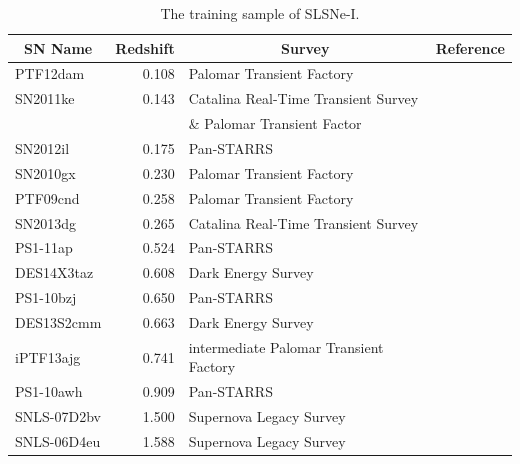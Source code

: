 \begin{table}
\begin{center}
  \caption{The training sample of SLSNe-I.}
\label{tab:PubishedSLSNe}
\begin{tabular}{|l|r|l|l|}
\hline
  \multicolumn{1}{|c|}{SN Name} &
  \multicolumn{1}{c|}{Redshift} &
  \multicolumn{1}{c|}{Survey} &
  \multicolumn{1}{c|}{Reference} \\
\hline
  PTF12dam         & 0.108 & Palomar Transient Factory             & \citet{Nicholl2013}\\
  SN2011ke         & 0.143 & Catalina Real-Time Transient Survey     & \citet{Inserra2013}\\
                      &       & \& Palomar Transient Factor & \\
  SN2012il         & 0.175 & Pan-STARRS                             & \citet{Lunnan2013}\\
  SN2010gx         & 0.230 & Palomar Transient Factory             & \citet{Pastorello2010}\\
  PTF09cnd         & 0.258 & Palomar Transient Factory             & \citet{Quimby2011}\\
  SN2013dg         & 0.265 & Catalina Real-Time Transient Survey     & \citet{Nicholl2014} \\
  PS1-11ap         & 0.524 & Pan-STARRS                             & \citet{McCrum2014a}\\
  DES14X3taz     & 0.608 & Dark Energy Survey                     & \citet{Smith2016} \\
  PS1-10bzj     & 0.650 & Pan-STARRS                             & \citet{Lunnan2013}\\
  DES13S2cmm     & 0.663 & Dark Energy Survey                     & \citet{Papadopoulos2015} \\
  iPTF13ajg     & 0.741 & intermediate Palomar Transient Factory&\citet{Vreeswijk2014}\\
  PS1-10awh     & 0.909 & Pan-STARRS                             & \citet{Chomiuk2011}\\
  SNLS-07D2bv & 1.500 & Supernova Legacy Survey                 &\citet{Howell2013}\\
  SNLS-06D4eu & 1.588 & Supernova Legacy Survey                 &\citet{Howell2013}\\
\hline\end{tabular}
\end{center}
\end{table}
